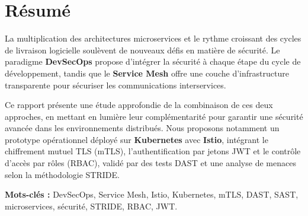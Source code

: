 \chapter*{Résumé}

La multiplication des architectures microservices et le rythme croissant des cycles
de livraison logicielle soulèvent de nouveaux défis en matière de sécurité.
Le paradigme \textbf{DevSecOps} propose d'intégrer la sécurité à chaque étape
du cycle de développement, tandis que le \textbf{Service Mesh} offre une couche
d'infrastructure transparente pour sécuriser les communications interservices.

Ce rapport présente une étude approfondie de la combinaison de ces deux approches,
en mettant en lumière leur complémentarité pour garantir une sécurité avancée dans
les environnements distribués. Nous proposons notamment un prototype opérationnel
déployé sur \textbf{Kubernetes} avec \textbf{Istio}, intégrant le chiffrement
mutuel TLS (mTLS), l'authentification par jetons JWT et le contrôle d'accès
par rôles (RBAC), validé par des tests DAST et une analyse de menaces selon
la méthodologie STRIDE.

\medskip
\noindent\textbf{Mots-clés :} DevSecOps, Service Mesh, Istio, Kubernetes,
mTLS, DAST, SAST, microservices, sécurité, STRIDE, RBAC, JWT.

